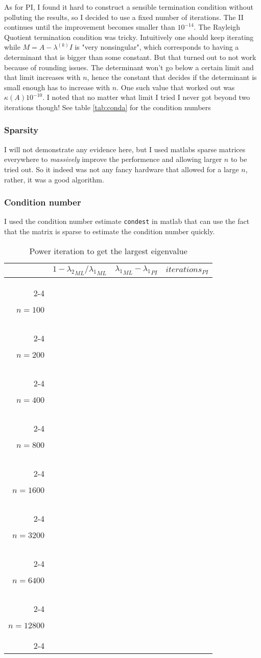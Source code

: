 \documentclass[a4paper,11pt]{article}
\begin{document}
As for PI, I found it hard to construct a sensible termination condition
without polluting the results, so I decided to use a fixed number of
iterations. The II continues until the improvement becomes smaller than
$10^{-14}$. The Rayleigh Quotient termination condition was tricky.
Intuitively one should keep iterating while $M=A-\lambda^{(k)}I$ is "very
nonsingular", which corresponds to having a determinant that is bigger
than some constant. But that turned out to not work because of rounding
issues. The determinant won't go below a certain limit and that limit
increases with $n$, hence the constant that decides if the determinant
is small enough has to increase with $n$. One such value that worked out
was $\kappa(A)10^{-10}$. I noted that no matter what limit I tried I
never got beyond two iterations though! See table \ref{tab:conda} for
the condition numbers

\subsubsection{Sparsity}

I will not demonstrate any evidence here, but I used matlabs sparse
matrices everywhere to \emph{massively} improve the performence and
allowing larger $n$ to be tried out. So it indeed was not any fancy
hardware that allowed for a large $n$, rather, it was a good algorithm.

\subsubsection{Condition number}

I used the condition number estimate \texttt{condest} in matlab that can
use the fact that the matrix is sparse to estimate the condition number
quickly.

\newcommand{\fornTwo}[1] {
  #1{100}
  #1{200}
}

\newcommand{\fornSix}[1] {
  \fornTwo{#1}
  #1{400}
  #1{800}
  #1{1600}
  #1{3200}
}

\newcommand{\fornEight}[1] {
  \fornSix{#1}
  #1{6400}
  #1{12800}
}

\newcommand{\fornTen}[1] {
  \fornEight{#1}
  #1{25600}
  #1{51200}
}

\newcommand{\pimacro}[1] {
  \ensuremath{n=#1} & 
                    & 
                    & 
                    \\ \cline{2-4}
}
\begin{table}[h]
  \centering
  \begin{tabular}{r|c|c|c|}
    \multicolumn{1}{r}{}
     & \multicolumn{1}{c}{$1-{\lambda_2}_{ML}/{\lambda_1}_{ML}$}
     & \multicolumn{1}{c}{${\lambda_1}_{ML}-{\lambda_1}_{PI}$}
     & \multicolumn{1}{c}{$iterations_{PI}$}\\
    \cline{2-4}
    \fornEight{\pimacro}
  \end{tabular}
  \caption{Power iteration to get the largest eigenvalue}
  \label{tab:powerit}
\end{table}
\end{document}
